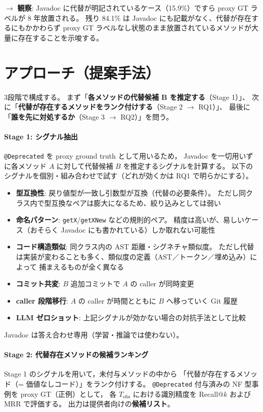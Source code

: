 \documentclass[a4paper,12pt]{article}
\begin{document}
\medskip
$\rightarrow$ \textbf{観察}: Javadoc に代替が明記されているケース（15.9\%）ですら proxy GT ラベルが 8 年放置される。
残り 84.1\% は Javadoc にも記載がなく、代替が存在するにもかかわらず
proxy GT ラベルなし状態のまま放置されているメソッドが大量に存在することを示唆する。

\section{アプローチ（提案手法）}

3段階で構成する。
まず「\textbf{各メソッドの代替候補 B を推定する}（Stage 1）」、
次に「\textbf{代替が存在するメソッドをランク付けする}（Stage 2 $\to$ RQ1）」、
最後に「\textbf{誰を先に対処するか}（Stage 3 $\to$ RQ2）」を問う。

\paragraph{Stage 1: シグナル抽出}
\texttt{@Deprecated} を proxy ground truth として用いるため，
Javadoc を一切用いずに各メソッド $A$ に対して代替候補 $B$ を推定するシグナルを計算する。
以下のシグナルを個別・組み合わせで試す（どれが効くかは RQ1 で明らかにする）。

\begin{itemize}
  \item \textbf{型互換性}: 戻り値型が一致し引数型が互換（代替の必要条件）。
        ただし同クラス内で型互換なペアは膨大になるため、絞り込みとしては弱い
  \item \textbf{命名パターン}: \texttt{getX}/\texttt{getXNew} などの規則的ペア。
        精度は高いが、易しいケース（おそらく Javadoc にも書かれている）しか取れない可能性
  \item \textbf{コード構造類似}: 同クラス内の AST 距離・シグネチャ類似度。
        ただし代替は実装が変わることも多く、類似度の定義（AST／トークン／埋め込み）によって
        捕まえるものが全く異なる
  \item \textbf{コミット共変}: $B$ 追加コミットで $A$ の caller が同時変更
  \item \textbf{caller 段階移行}: $A$ の caller が時間とともに $B$ へ移っていく Git 履歴
  \item \textbf{LLM ゼロショット}: 上記シグナルが効かない場合の対抗手法として比較
\end{itemize}

\noindent Javadoc は答え合わせ専用（学習・推論では使わない）。

\paragraph{Stage 2: 代替存在メソッドの候補ランキング}
Stage 1 のシグナルを用いて，未付与メソッドの中から
「代替が存在するメソッド（= 価値なしコード）」をランク付けする。
\texttt{@Deprecated} 付与済みの NF 型事例を proxy GT（正例）として，
各 $T_\text{obs}$ における識別精度を Recall@$k$ および MRR で評価する。
出力は提供者向けの\textbf{候補リスト}。
\end{document}

